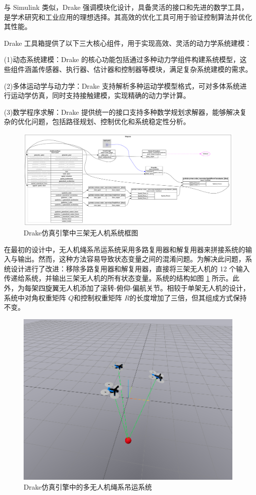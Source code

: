 \documentclass[lang=chs, degree=master, blindreview=true, winfonts=true]{yanputhesis}
\begin{document}
与 Simulink 类似，Drake 强调模块化设计，具备灵活的接口和先进的数学工具，是学术研究和工业应用的理想选择。其高效的优化工具可用于验证控制算法并优化其性能。

Drake 工具箱提供了以下三大核心组件，用于实现高效、灵活的动力学系统建模：

(1)动态系统建模：Drake 的核心功能包括通过多种动力学组件构建系统模型，这些组件涵盖传感器、执行器、估计器和控制器等模块，满足复杂系统建模的需求。

(2)多体运动学与动力学：Drake 支持解析多种运动学模型格式，可对多体系统进行运动学仿真，同时支持接触建模，实现精确的动力学计算。

(3)数学程序求解：Drake 提供统一的接口支持多种数学规划求解器，能够解决复杂的优化问题，包括路径规划、控制优化和系统稳定性分析。

\begin{figure}[hbt!]
	\centering
	\includegraphics[width=38pc]{picture/drake.png} 
	\caption{Drake仿真引擎中三架无人机系统框图} 
	\label{drake}
\end{figure}
在最初的设计中，无人机绳系吊运系统采用多路复用器和解复用器来拼接系统的输入与输出。然而，这种方法容易导致状态变量之间的混淆问题。为解决此问题，系统设计进行了改进：移除多路复用器和解复用器，直接将三架无人机的 12 个输入传递给系统，并输出三架无人机的所有状态变量。系统的结构如图 \ref{drake} 所示。此外，为每架四旋翼无人机添加了滚转-俯仰-偏航关节。相较于单架无人机的设计，系统中对角权重矩阵 $Q$和控制权重矩阵 $R$的长度增加了三倍，但其组成方式保持不变。

\begin{figure}[hbt!]
	\centering
	\includegraphics[width=36pc]{picture/5_1.png} 
	\caption{Drake仿真引擎中的多无人机绳系吊运系统} 
	\label{5_1}
\end{figure}
\end{document}
